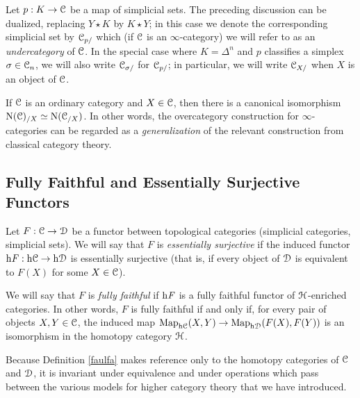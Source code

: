 \begin{Didn't Read}
\begin{remark} Let $p: K \rightarrow \operatorname{\mathcal{C}}$ be a map of simplicial sets. The
preceding discussion can be dualized, replacing $Y \star K$
by $K \star Y$; in this case we denote the corresponding simplicial set
by $\operatorname{\mathcal{C}}_{p/}$ which (if $\operatorname{\mathcal{C}}$ is an $\infty$-category) we will refer to as an
{\it undercategory} of $\operatorname{\mathcal{C}}$. In the special case where $K = \Delta^n$ and $p$ classifies a simplex $\sigma \in \operatorname{\mathcal{C}}_{n}$, we will also write $\operatorname{\mathcal{C}}_{\sigma/}$ for $\operatorname{\mathcal{C}}_{p/}$; in particular, we will write $\operatorname{\mathcal{C}}_{X/}$ when $X$ is an object of $\operatorname{\mathcal{C}}$.
\end{remark}

\begin{remark}
If $\operatorname{\mathcal{C}}$ is an ordinary category and $X \in \operatorname{\mathcal{C}}$,
then there is a canonical isomorphism $\operatorname{N}(\operatorname{\mathcal{C}})_{/X} \simeq \operatorname{N} (\operatorname{\mathcal{C}}_{/X})$. In other words, the overcategory construction for $\infty$-categories can be regarded as a {\em generalization} of the relevant construction from classical category theory.
\end{remark}

\subsection{Fully Faithful and Essentially Surjective Functors}

\begin{definition}\label{faulfa}
Let $F: \operatorname{\mathcal{C}} \rightarrow \operatorname{\mathcal{D}}$ be a functor between topological categories (simplicial categories, simplicial sets). We will say that $F$ is {\it essentially surjective} if the induced functor 
$\rm{h} \it{F}: \rm{h} \it{\operatorname{\mathcal{C}}} \rightarrow \rm{h} \it{\operatorname{\mathcal{D}}}$ is essentially surjective (that is, if every object of $\operatorname{\mathcal{D}}$ is
equivalent to $F(X)$ for some $X \in \operatorname{\mathcal{C}}$). 

We will say that $F$ is {\it fully faithful} if $\rm{h} \it{F}$ is a fully faithful functor of $\operatorname{\mathcal{H}}$-enriched categories. In other words, $F$ is fully faithful if and only if, for every pair of objects
$X, Y \in \operatorname{\mathcal{C}}$, the induced map
$\operatorname{{Map}}_{\rm{h} \it{\operatorname{\mathcal{C}}}}(X,Y) \rightarrow \operatorname{{Map}}_{\rm{h} \it{\operatorname{\mathcal{D}}}}(F(X),F(Y))$ is an isomorphism in the homotopy category $\operatorname{\mathcal{H}}$. 
\end{definition}

\begin{remark}
Because Definition \ref{faulfa} makes reference only to the homotopy categories of $\operatorname{\mathcal{C}}$ and $\operatorname{\mathcal{D}}$, it is invariant under equivalence and under operations which pass between
the various models for higher category theory that we have introduced.
\end{remark}


\end{Didn't Read}
